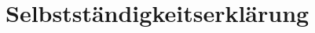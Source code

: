 \documentclass[english,12pt,doc]{apa}
\begin{document}
\section{Selbstständigkeitserklärung}
\blindtext

\end{document}
